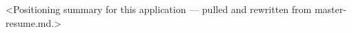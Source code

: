 
\begin{cvparagraph}
<Positioning summary for this application — pulled and rewritten from master-resume.md.>
\end{cvparagraph}
